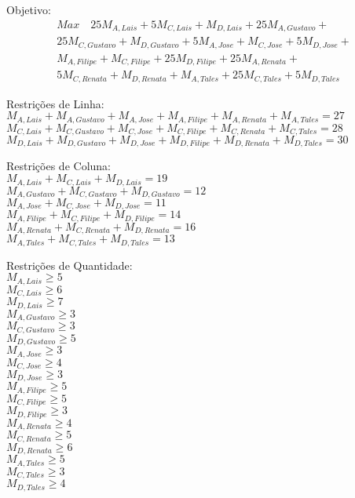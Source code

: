 \documentclass{article}
\begin{document}
	Objetivo:
	\begin{multline}
		Max \quad 25 M_{A,Lais} + 5 M_{C,Lais} + M_{D,Lais} + 25 M_{A,Gustavo} + \\
		25 M_{C,Gustavo} + M_{D,Gustavo} + 5 M_{A,Jose} + M_{C,Jose} + 5 M_{D,Jose} + \\
		M_{A,Filipe} + M_{C,Filipe} + 25 M_{D,Filipe} + 25 M_{A,Renata} + \\
		5 M_{C,Renata} + M_{D,Renata} + M_{A,Tales} + 25 M_{C,Tales} + 5 M_{D,Tales}
	\end{multline}
	\vspace{5mm}

	Restrições de Linha: \\
	$M_{A,Lais} + M_{A,Gustavo} + M_{A,Jose} + M_{A,Filipe} + M_{A,Renata} + M_{A,Tales} = 27$ \\
    $M_{C,Lais} + M_{C,Gustavo} + M_{C,Jose} + M_{C,Filipe} + M_{C,Renata} + M_{C,Tales} = 28$ \\
    $M_{D,Lais} + M_{D,Gustavo} + M_{D,Jose} + M_{D,Filipe} + M_{D,Renata} + M_{D,Tales} = 30$
	\vspace{5mm}

	Restrições de Coluna: \\
    $M_{A,Lais} + M_{C,Lais} + M_{D,Lais} = 19$ \\
    $M_{A,Gustavo} + M_{C,Gustavo} + M_{D,Gustavo} = 12$ \\
    $M_{A,Jose} + M_{C,Jose} + M_{D,Jose} = 11$ \\
    $M_{A,Filipe} + M_{C,Filipe} + M_{D,Filipe} = 14$ \\
    $M_{A,Renata} + M_{C,Renata} + M_{D,Renata} = 16$ \\
    $M_{A,Tales} + M_{C,Tales} + M_{D,Tales} = 13$
	\vspace{5mm}

	Restrições de Quantidade: \\
    $M_{A,Lais} \geq 5$ \\
    $M_{C,Lais} \geq 6$ \\
    $M_{D,Lais} \geq 7$ \\
    $M_{A,Gustavo} \geq 3$ \\
    $M_{C,Gustavo} \geq 3$ \\
    $M_{D,Gustavo} \geq 5$ \\
    $M_{A,Jose} \geq 3$ \\
    $M_{C,Jose} \geq 4$ \\
    $M_{D,Jose} \geq 3$ \\
    $M_{A,Filipe} \geq 5$ \\
    $M_{C,Filipe} \geq 5$ \\
    $M_{D,Filipe} \geq 3$ \\
    $M_{A,Renata} \geq 4$ \\
    $M_{C,Renata} \geq 5$ \\
    $M_{D,Renata} \geq 6$ \\
    $M_{A,Tales} \geq 5$ \\
    $M_{C,Tales} \geq 3$ \\
    $M_{D,Tales} \geq 4$
	\vspace{5mm}
\end{document}

